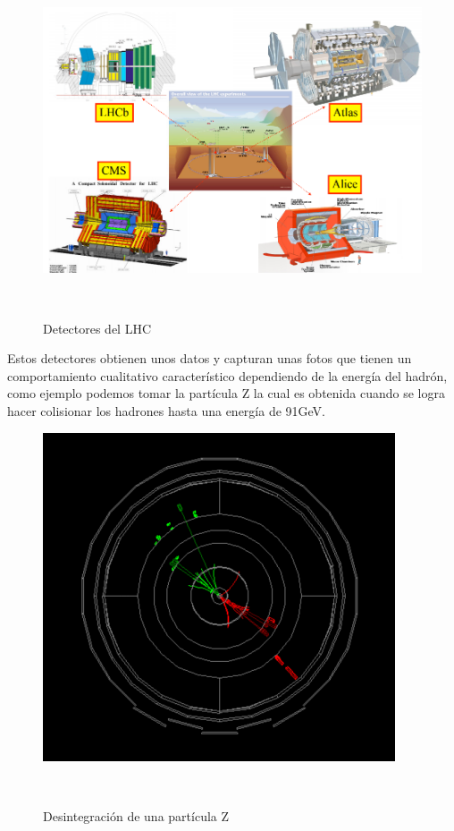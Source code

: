 \documentclass[%
 reprint,
 amsmath,amssymb,
 aps,
]{revtex4-2}
\begin{document}
\begin{figure}[H]
\begin{center}
\includegraphics[scale=0.26]{detectores.png}
\caption{Detectores del LHC}\\
\centering
\end{center}
\end{figure}

Estos detectores obtienen unos datos y capturan unas fotos que tienen un comportamiento cualitativo característico dependiendo de la energía del hadrón, como ejemplo podemos tomar la partícula Z la cual es obtenida cuando se logra hacer colisionar los hadrones hasta una energía de 91GeV.

\begin{figure}[H]
\begin{center}
\includegraphics[scale=0.4]{Z.png}
\caption{Desintegración de una partícula Z}\\
\centering
\end{center}
\end{figure}
\end{document}
